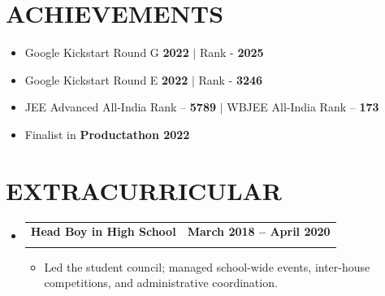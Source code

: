 \documentclass[letterpaper,11pt]{article}
\makeatletter
\newcommand{\resumeItem}[1]{
  \item\small{
    {#1 \vspace{-2pt}}
  }
}
\newcommand{\resumeSubheading}[4]{
  \vspace{-2pt}\item
    \begin{tabular*}{1.0\textwidth}[t]{l@{\extracolsep{\fill}}r}
      \textbf{\large#1} & \textbf{\small #2} \\
      \textit{\large#3} & \textit{\small #4} \\
      
    \end{tabular*}\vspace{-7pt}
}
\newcommand{\resumeSubHeadingListStart}{\begin{itemize}[leftmargin=0.0in, label={}]}
\newcommand{\resumeSubHeadingListEnd}{\end{itemize}}
\newcommand{\resumeItemListStart}{\begin{itemize}}
\newcommand{\resumeItemListEnd}{\end{itemize}\vspace{-5pt}}
\makeatother
\begin{document}
\section{ACHIEVEMENTS}
\resumeItemListStart
    \resumeItem{\normalsize{Google Kickstart Round G \textbf{2022} $|$ Rank - \textbf{2025} \href{https://drive.google.com/file/d/1XiAeBao1RJKzIclkJ124O35rVYAEprz1/view?usp=sharing}{\raisebox{-0.1\height}\faExternalLink}}}
    \resumeItem{\normalsize{Google Kickstart Round E \textbf{2022} $|$ Rank - \textbf{3246} \href{https://drive.google.com/file/d/1XiAeBao1RJKzIclkJ124O35rVYAEprz1/view?usp=sharing}{\raisebox{-0.1\height}\faExternalLink}}}
    \resumeItem{\normalsize{JEE Advanced All-India Rank -- \textbf{5789} $|$ WBJEE All-India Rank -- \textbf{173}}}
    \resumeItem{\normalsize{Finalist in \textbf{Productathon 2022} \href{https://drive.google.com/file/d/1jZIwkHOhi3yYrjM9RRhXphR2mm_T7PkC/view?usp=sharing}{\raisebox{-0.1\height}\faExternalLink}}}
\resumeItemListEnd
\vspace{-10pt}


\section{EXTRACURRICULAR}
    \resumeSubHeadingListStart
        \resumeSubheading{Head Boy in High School}{March 2018 -- April 2020}{}{}
        \vspace{-15pt} 
            \resumeItemListStart
                \resumeItem{\normalsize{Led the student council; managed school-wide events, inter-house competitions, and administrative coordination.}}
            \resumeItemListEnd
    \resumeSubHeadingListEnd
\end{document}
